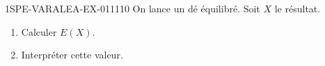 \begin{exercice}{1SPE-VARALEA-EX-011}{1}{10}
On lance un dé équilibré. Soit $X$ le résultat.

\begin{enumerate}
  \item Calculer $E(X)$.
  \item Interpréter cette valeur.
\end{enumerate}
\end{exercice}
